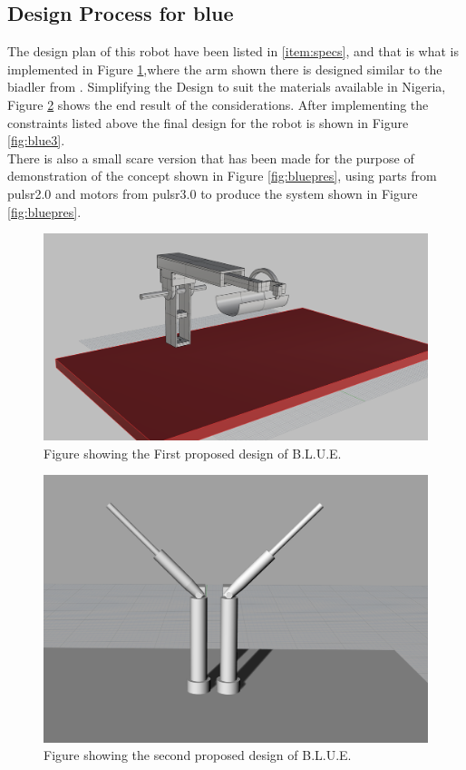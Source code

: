 \subsection{Design Process for \ac{blue}}
The design plan of this robot have been listed in \ref{item:specs}, and that is what is implemented in Figure \ref{fig:blue1},where the arm shown there is designed similar to the \ac{biadler} from \cite{Johnson2011}.
Simplifying the Design to suit the materials available in Nigeria, Figure \ref{fig:blue2} shows the end result of the considerations. After implementing the constraints listed above the final design for the robot is shown in Figure \ref{fig:blue3}.\\
There is also a small scare version that has been made for the purpose of demonstration of the concept shown in Figure \ref{fig:bluepres}, using parts from \ac{pulsr}2.0 and motors from \ac{pulsr}3.0 to produce the system shown in Figure \ref{fig:bluepres}.

\begin{figure}[p]%
	\centering
	\includegraphics[width=\linewidth]{figures/ch3/bluedesign1}
	\caption{Figure showing the First proposed design of B.L.U.E.}
	\label{fig:blue1}
\end{figure}

\begin{figure}[p]%
	\centering
	\includegraphics[width=\linewidth]{figures/ch3/bluedesign2}
	\caption{Figure showing the second proposed design of B.L.U.E.}
	\label{fig:blue2}
\end{figure}


